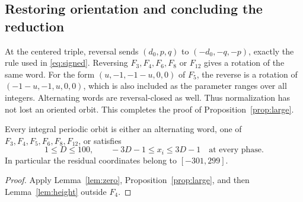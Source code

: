 \subsection{Restoring orientation and concluding the reduction}
At the centered triple, reversal sends
$(d_0,p,q)$ to $(-d_0,-q,-p)$, exactly the rule used in
\eqref{eq:signed}. Reversing $F_3,F_4,F_6,F_8$ or
$F_{12}$ gives a rotation of the same word.
For the form $(u,-1,-1-u,0,0)$ of $F_5$, the reverse is
a rotation of $(-1-u,-1,u,0,0)$, which is also included
as the parameter ranges over all integers. Alternating words
are reversal-closed as well. Thus normalization has not lost
an oriented orbit. This completes the proof of
Proposition~\ref{prop:large}.

\begin{corollary}
\label{cor:core}
Every integral periodic orbit is either an alternating word,
one of $F_3,F_4,F_5,F_6,F_8,F_{12}$, or satisfies
\begin{equation}
 1\le D\le100,\qquad -3D-1\le x_i\le3D-1
 \quad\text{at every phase}.
 \label{eq:core}
\end{equation}
In particular the residual coordinates belong to $[-301,299]$.
\end{corollary}
\begin{proof}
Apply Lemma~\ref{lem:zero}, Proposition~\ref{prop:large},
and then Lemma~\ref{lem:height} outside $F_4$.
\end{proof}
